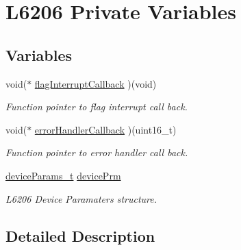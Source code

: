 \hypertarget{group___l6206___private___variables}{}\section{L6206 Private Variables}
\label{group___l6206___private___variables}
\subsection*{Variables}
\begin{DoxyCompactItemize}
\item 
\mbox{\label{group___l6206___private___variables_ga77afc99bf53e1502db1031d2591d0a12}} 
void($\ast$ \mbox{\hyperlink{group___l6206___private___variables_ga77afc99bf53e1502db1031d2591d0a12}{flag\+Interrupt\+Callback}} )(void)
\begin{DoxyCompactList}\small\item\em Function pointer to flag interrupt call back. \end{DoxyCompactList}\item 
\mbox{\label{group___l6206___private___variables_ga1e4e82c3653b94fad7b1990de385d6d3}} 
void($\ast$ \mbox{\hyperlink{group___l6206___private___variables_ga1e4e82c3653b94fad7b1990de385d6d3}{error\+Handler\+Callback}} )(uint16\+\_\+t)
\begin{DoxyCompactList}\small\item\em Function pointer to error handler call back. \end{DoxyCompactList}\item 
\mbox{\label{group___l6206___private___variables_ga9867ddef03408c3386aad42300f25653}} 
\mbox{\hyperlink{structdevice_params__t}{device\+Params\+\_\+t}} \mbox{\hyperlink{group___l6206___private___variables_ga9867ddef03408c3386aad42300f25653}{device\+Prm}}
\begin{DoxyCompactList}\small\item\em L6206 Device Paramaters structure. \end{DoxyCompactList}\end{DoxyCompactItemize}


\subsection{Detailed Description}
